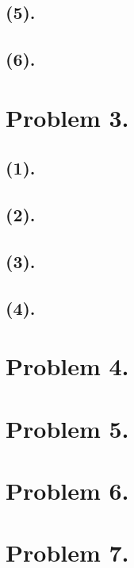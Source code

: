 \documentclass{article}
\begin{document}
\subsection{(5).}
\subsection{(6).}
\section{Problem 3.}
\subsection{(1).}
\subsection{(2).}
\subsection{(3).}
\subsection{(4).}
\section{Problem 4.}
\section{Problem 5.}
\section{Problem 6.}
\section{Problem 7.}
\end{document}
